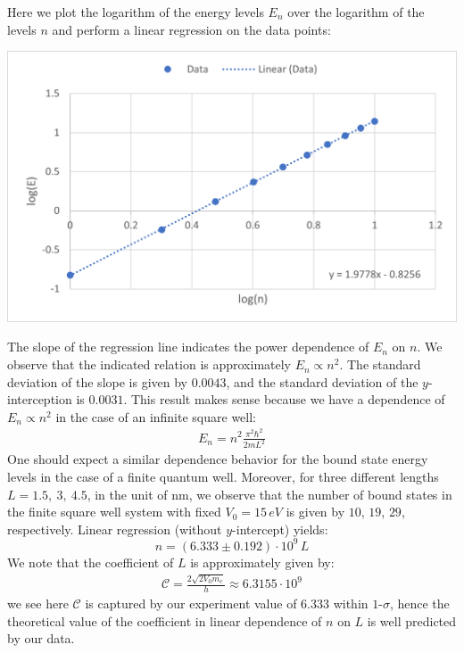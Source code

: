 \documentclass[11pt]{book}
\theoremstyle{break}
\theoremstyle{break}
\begin{document}
Here we plot the logarithm of the energy levels $E_n$ over the logarithm of the levels $n$ and perform a linear regression on the data points:
\begin{center}
\includegraphics[scale=1.19]{1}
\end{center}
The slope of the regression line indicates the power dependence of $E_n$ on $n$. We observe that the indicated relation is approximately $E_n \propto n^2$. The standard deviation of the slope is given by $0.0043$, and the standard deviation of the $y$-interception is $0.0031$. This result makes sense because we have a dependence of $E_n \propto n^2$ in the case of an infinite square well:
\begin{align*}
E_n = n^2 \frac{\pi^2 \hbar^2}{2mL^2}
\end{align*}
One should expect a similar dependence behavior for the bound state energy levels in the case of a finite quantum well. Moreover, for three different lengths $L = 1.5,\ 3,\ 4.5$, in the unit of nm, we observe that the number of bound states in the finite square well system with fixed $V_0 = 15\, eV$ is given by $10$, $19$, $29$, respectively. Linear regression (without $y$-intercept) yields: 
$$n = (6.333\pm 0.192)\cdot 10^9 \, L$$ 
We note that the coefficient of $L$ is approximately given by:
\begin{align*}
\mathcal{C} = \frac{2\sqrt{2V_0  m_e} }{h} \approx 6.3155 \cdot 10^{9}
\end{align*}
we see here $\mathcal{C}$ is captured by our experiment value of $6.333$ within $1$-$\sigma$, hence the theoretical value of the coefficient in linear dependence of $n$ on $L$ is well predicted by our data. 
\end{document}
